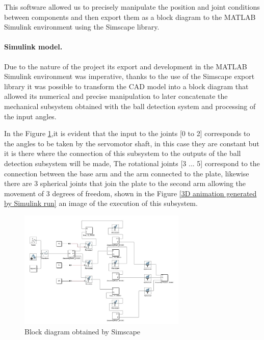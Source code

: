     This software allowed us to precisely manipulate the position and joint conditions between components and then export them as a block diagram to the MATLAB Simulink environment using the Simscape\cite{noauthor_simscape_nodate} library.

    \paragraph{Simulink model.}

Due to the nature of the project its export and development in the MATLAB Simulink environment was imperative, thanks to the use of the Simscape export library it was possible to transform the CAD model into a block diagram that allowed its numerical and precise manipulation to later concatenate the mechanical subsystem obtained with the ball detection system and processing of the input angles.

In the Figure \ref{Block diagram obtained by Simscape},it is evident that the input to the joints [0 to 2] corresponds to the angles to be taken by the servomotor shaft, in this case they are constant but it is there where the connection of this subsystem to the outputs of the ball detection subsystem will be made, The rotational joints [3 ... 5] correspond to the connection between the base arm and the arm connected to the plate, likewise there are 3 spherical joints that join the plate to the second arm allowing the movement of 3 degrees of freedom, shown in the Figure \ref{3D animation generated by Simulink run} an image of the execution of this subsystem.
\begin{center}
    \begin{figure}[ht!]
        \centering
        \includegraphics[width=8cm, keepaspectratio]{imports/diagrammeblocs.jpg}
        \caption{Block diagram obtained by Simscape}
        \label{Block diagram obtained by Simscape}
    \end{figure}
\end{center}


